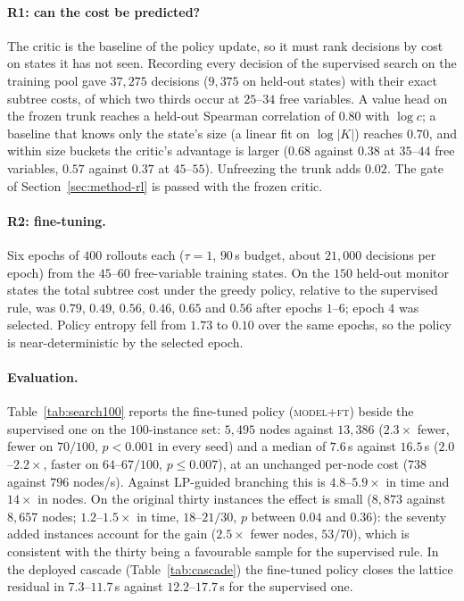 \documentclass[preprint,12pt]{elsarticle}
\begin{document}
\paragraph{R1: can the cost be predicted?} The critic is the baseline of the policy update, so it must rank decisions by cost on states it has not seen. Recording every decision of the supervised search on the training pool gave $37{,}275$ decisions ($9{,}375$ on held-out states) with their exact subtree costs, of which two thirds occur at $25$--$34$ free variables. A value head on the frozen trunk reaches a held-out Spearman correlation of $0.80$ with $\log c$; a baseline that knows only the state's size (a linear fit on $\log|K|$) reaches $0.70$, and within size buckets the critic's advantage is larger ($0.68$ against $0.38$ at $35$--$44$ free variables, $0.57$ against $0.37$ at $45$--$55$). Unfreezing the trunk adds $0.02$. The gate of Section~\ref{sec:method-rl} is passed with the frozen critic.

\paragraph{R2: fine-tuning.} Six epochs of $400$ rollouts each ($\tau=1$, $90$\,s budget, about $21{,}000$ decisions per epoch) from the $45$--$60$ free-variable training states. On the $150$ held-out monitor states the total subtree cost under the greedy policy, relative to the supervised rule, was $0.79$, $0.49$, $0.56$, $0.46$, $0.65$ and $0.56$ after epochs $1$--$6$; epoch $4$ was selected. Policy entropy fell from $1.73$ to $0.10$ over the same epochs, so the policy is near-deterministic by the selected epoch.

\paragraph{Evaluation.} Table~\ref{tab:search100} reports the fine-tuned policy (\textsc{model+ft}) beside the supervised one on the $100$-instance set: $5{,}495$ nodes against $13{,}386$ ($2.3\times$ fewer, fewer on $70/100$, $p<0.001$ in every seed) and a median of $7.6$\,s against $16.5$\,s ($2.0$--$2.2\times$, faster on $64$--$67/100$, $p\le0.007$), at an unchanged per-node cost ($738$ against $796$ nodes/s). Against LP-guided branching this is $4.8$--$5.9\times$ in time and $14\times$ in nodes. On the original thirty instances the effect is small ($8{,}873$ against $8{,}657$ nodes; $1.2$--$1.5\times$ in time, $18$--$21/30$, $p$ between $0.04$ and $0.36$): the seventy added instances account for the gain ($2.5\times$ fewer nodes, $53/70$), which is consistent with the thirty being a favourable sample for the supervised rule. In the deployed cascade (Table~\ref{tab:cascade}) the fine-tuned policy closes the lattice residual in $7.3$--$11.7$\,s against $12.2$--$17.7$\,s for the supervised one.
\end{document}
